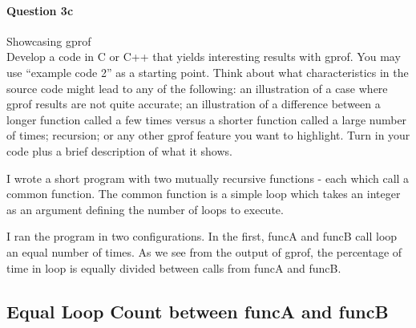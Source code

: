 \documentclass[11pt]{article}
\begin{document}
\paragraph{Question 3c} Showcasing gprof\\

Develop a code in C or C++ that yields interesting results with gprof. You may use “example code 2” as a starting point. Think about what characteristics in the source code might lead to any of the following: an illustration of a case where gprof results are not quite accurate; an illustration of a difference between a longer function called a few times versus a shorter function called a large number of times; recursion; or any other gprof feature you want to highlight.
Turn in your code plus a brief description of what it shows.

I wrote a short program with two mutually recursive functions - each which call a common function.  The common function is a simple loop which takes an integer as an argument defining the number of loops to execute.  

I ran the program in two configurations. In the first, funcA and funcB call loop an equal number of times.  As we see from the output of gprof, the percentage of time in loop is equally divided between calls from funcA and funcB.

\subsection*{Equal Loop Count between funcA and funcB}
\end{document}
